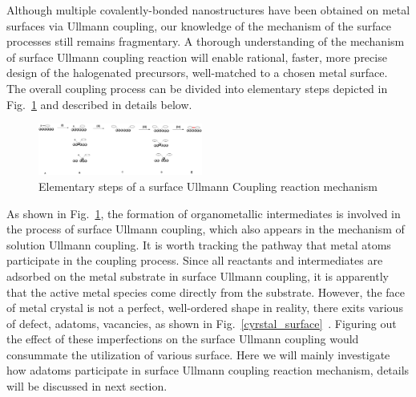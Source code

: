 \documentclass[%
 reprint,
 amsmath,amssymb,
 aps,
prb,
]{revtex4-2}
\begin{document}
Although multiple covalently-bonded nanostructures have been obtained on metal surfaces via Ullmann coupling, our knowledge of the mechanism of the surface processes still remains fragmentary. 
%
A thorough understanding of the mechanism of surface Ullmann coupling reaction will enable rational, faster, more precise design of the halogenated precursors, well-matched to a chosen metal surface.
%
The overall coupling process can be divided into elementary steps depicted in Fig.~\ref{fig_mecha} and described in details below.
\begin{figure}[htb]
\centering
\includegraphics[width=0.48\textwidth]{Fig/mechanism.png}
\caption{Elementary steps of a surface Ullmann Coupling reaction mechanism}
\label{fig_mecha}
\end{figure}

As shown in Fig.~\ref{fig_mecha}, the formation of organometallic intermediates is involved in the process of surface Ullmann coupling, which also appears in the mechanism of solution Ullmann coupling. It is worth tracking the pathway that metal atoms participate in the coupling process. Since all reactants and intermediates are adsorbed on the metal substrate in surface Ullmann coupling, it is apparently that the active metal species come directly from the substrate. However, the face of metal crystal is not a perfect, well-ordered shape in reality, there exits various of defect, adatoms, vacancies, as shown in Fig.~\ref{cyrstal_surface}~\cite{ullmann_49}. Figuring out the effect of these imperfections on the surface Ullmann coupling would consummate the utilization of various surface. Here we will mainly investigate how adatoms participate in surface Ullmann coupling reaction mechanism, details will be discussed in next section.
\end{document}

